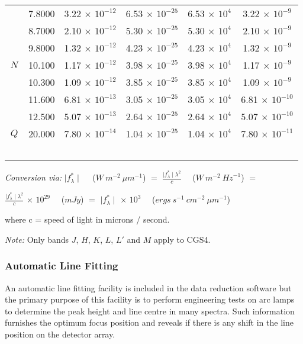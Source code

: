 {\begin{table}
\begin{center}
\begin{tabular}{|c|c|c|c|c|c|}
\    &  7.8000  &  3.22 $\times$ $10^{-12}$ & 6.53 $\times$ $10^{-25}$ & 6.53 $\times$ $10^{4}$ & 3.22 $\times$ $10^{-9}$ \\
\    &  8.7000  &  2.10 $\times$ $10^{-12}$ & 5.30 $\times$ $10^{-25}$ & 5.30 $\times$ $10^{4}$ & 2.10 $\times$ $10^{-9}$ \\
\    &  9.8000  &  1.32 $\times$ $10^{-12}$ & 4.23 $\times$ $10^{-25}$ & 4.23 $\times$ $10^{4}$ & 1.32 $\times$ $10^{-9}$ \\
$N$  &  10.100  &  1.17 $\times$ $10^{-12}$ & 3.98 $\times$ $10^{-25}$ & 3.98 $\times$ $10^{4}$ & 1.17 $\times$ $10^{-9}$ \\
\    &  10.300  &  1.09 $\times$ $10^{-12}$ & 3.85 $\times$ $10^{-25}$ & 3.85 $\times$ $10^{4}$ & 1.09 $\times$ $10^{-9}$ \\
\    &  11.600  &  6.81 $\times$ $10^{-13}$ & 3.05 $\times$ $10^{-25}$ & 3.05 $\times$ $10^{4}$ & 6.81 $\times$ $10^{-10}$ \\
\    &  12.500  &  5.07 $\times$ $10^{-13}$ & 2.64 $\times$ $10^{-25}$ & 2.64 $\times$ $10^{4}$ & 5.07 $\times$ $10^{-10}$ \\
$Q$  &  20.000  &  7.80 $\times$ $10^{-14}$ & 1.04 $\times$ $10^{-25}$ & 1.04 $\times$ $10^{4}$ & 7.80 $\times$ $10^{-11}$ \\
\ \ & \ \ & \ \ & \ \ & \ \ & \ \  \\
\hline
\end{tabular}
\vglue 0.3cm
{\em Conversion via: }
$\mid f_{\lambda}^{*} \mid$ \ \ ($W \ m^{-2} \ {\mu m}^{-1}$) $=$ 
$\frac{\mid f_{\lambda}^{*} \mid \lambda^{2}}{c}$ \ \ ($W \ m^{-2} \ {Hz}^{-1}$) $=$

$\frac{\mid f_{\lambda}^{*} \mid \lambda^{2}}{c}$ $\times$ $10^{29}$  \ \ ($mJy$) $=$
$\mid f_{\lambda}^{*} \mid$ $\times$ $10^{3}$ \ \ ($ergs \ s^{-1} \ cm^{-2} \ {\mu m}^{-1}$)

\vglue 0.1cm

where c = speed of light in microns / second.

\vglue 0.3cm
{\em Note: } Only bands $J$, $H$, $K$, $L$, $L'$ and $M$ apply to CGS4. 
\end{center}
\end{table}

\subsubsection{Automatic Line Fitting}
\label{automatic_line_fitting}

An automatic line fitting facility is included in the data reduction 
software but the primary purpose of this facility is to perform
engineering tests on arc lamps to determine the peak height and line 
centre in many spectra. Such information furnishes the optimum focus 
position and reveals if there is any shift in the line position on the 
detector array.

}
